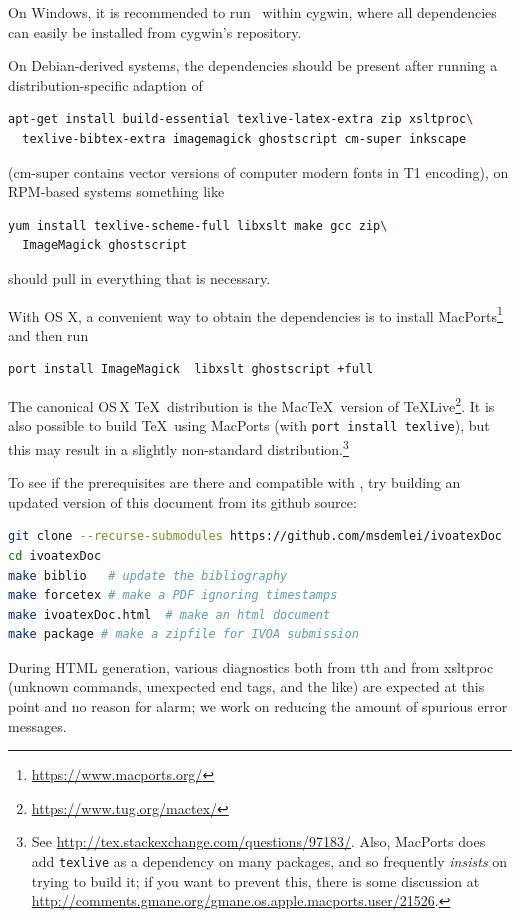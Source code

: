 \documentclass[11pt,a4paper]{ivoa}
\begin{document}
On Windows, it is recommended to run \ivoatex\ within cygwin, where all
dependencies can easily be installed from cygwin's repository.  

On
Debian-derived systems, the dependencies should be present after
running a distribution-specific adaption of
\begin{lstlisting}[language=sh,basicstyle=\footnotesize]
apt-get install build-essential texlive-latex-extra zip xsltproc\
  texlive-bibtex-extra imagemagick ghostscript cm-super inkscape
\end{lstlisting}
(cm-super contains vector versions of computer modern fonts in T1
encoding), on RPM-based systems something like
\begin{lstlisting}[language=sh]
yum install texlive-scheme-full libxslt make gcc zip\
  ImageMagick ghostscript
\end{lstlisting}
should pull in everything that is necessary.

With OS X, a convenient way to obtain the dependencies is to install
MacPorts\footnote{\url{https://www.macports.org/}} and then run
\begin{lstlisting}[language=sh]
port install ImageMagick  libxslt ghostscript +full
\end{lstlisting}
The canonical OS\,X \TeX\ distribution is the Mac\TeX\ version of
\TeX Live\footnote{\url{https://www.tug.org/mactex/}}.  It is also
possible to build \TeX\ using MacPorts (with \texttt{port install
  texlive}), but this may result in a slightly non-standard
distribution.\footnote{See
  \url{http://tex.stackexchange.com/questions/97183/}.
  Also, MacPorts does add
  \texttt{texlive} as a dependency on many packages, and so frequently
  \emph{insists} on trying to build it; if you want to prevent this,
  there is some discussion at
  \url{http://comments.gmane.org/gmane.os.apple.macports.user/21526}.}

To see if the prerequisites are there and compatible with \ivoatex, try
building an updated version of this document from its github source:
\begin{lstlisting}[language=sh,basicstyle=\footnotesize]
git clone --recurse-submodules https://github.com/msdemlei/ivoatexDoc
cd ivoatexDoc
make biblio   # update the bibliography
make forcetex # make a PDF ignoring timestamps
make ivoatexDoc.html  # make an html document
make package # make a zipfile for IVOA submission
\end{lstlisting}

During HTML generation, various diagnostics both 
from tth and from xsltproc (unknown commands,
unexpected end tags, and the like) are
expected at this point and no reason for alarm; we work on reducing the
amount of spurious error messages.
\end{document}
